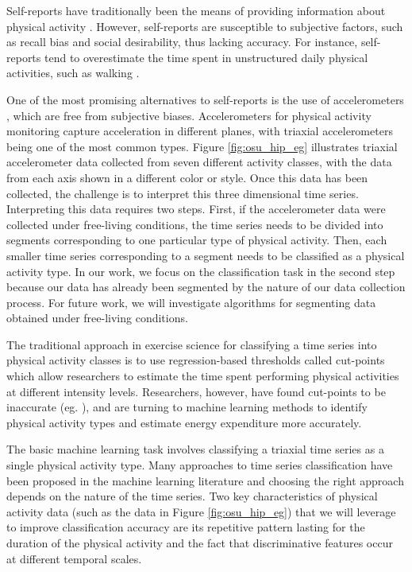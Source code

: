 \documentclass[letterpaper]{article}
\begin{document}
Self-reports have traditionally been the means of providing information about physical activity \cite{de2011adults}. However, self-reports are susceptible to subjective factors, such as recall bias and social desirability, thus lacking accuracy. For instance, self-reports tend to overestimate the time spent in unstructured daily physical activities, such as walking \cite{tudor2001challenges}. 

One of the most promising alternatives to self-reports is the use of accelerometers \cite{TMP:05}, which are free from subjective biases. Accelerometers for physical activity monitoring capture acceleration in different planes, with triaxial accelerometers being one of the most common types. Figure \ref{fig:osu_hip_eg} illustrates triaxial accelerometer data collected from seven different activity classes, with the data from each axis shown in a different color or style. Once this data has been collected, the challenge is to interpret this three dimensional time series. Interpreting this data requires two steps. First, if the accelerometer data were collected under free-living conditions, the time series needs to be divided into segments corresponding to one particular type of physical activity. Then, each smaller time series corresponding to a segment needs to be classified as a physical activity type. In our work, we focus on the classification task in the second step because our data has already been segmented by the nature of our data collection process. For future work, we will investigate algorithms for segmenting data obtained under free-living conditions.

The traditional approach in exercise science for classifying a time series into physical activity classes is to use regression-based thresholds called cut-points \cite{BRT:12} which allow researchers to estimate the time spent performing physical activities at different intensity levels. Researchers, however,  have found cut-points to be inaccurate (eg. \cite{staudenmayer2009artificial,trost2012artificial}), and are turning to machine learning methods to identify physical activity types and estimate energy expenditure more accurately.

The basic machine learning task involves classifying a triaxial time series as a single physical activity type. Many approaches to time series classification have been proposed in the machine learning literature \cite{XPK:10} and choosing the right approach depends on the nature of the time series. Two key characteristics of physical activity data (such as the data in Figure \ref{fig:osu_hip_eg}) that we will leverage to improve classification accuracy are its repetitive pattern lasting for the duration of the physical activity and the fact that discriminative features occur at different temporal scales. 
\end{document}
